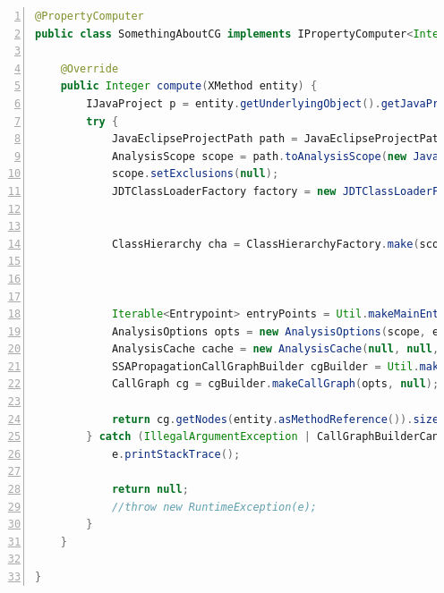 \small
\begin{lstlisting}[language=Java,numbers=left]
@PropertyComputer
public class SomethingAboutCG implements IPropertyComputer<Integer, XMethod> {

	@Override
	public Integer compute(XMethod entity) {
		IJavaProject p = entity.getUnderlyingObject().getJavaProject();
		try {
			JavaEclipseProjectPath path = JavaEclipseProjectPath.make(p, AnalysisScopeType.SOURCE_FOR_PROJ_AND_LINKED_PROJS);
			AnalysisScope scope = path.toAnalysisScope(new JavaSourceAnalysisScope());
			scope.setExclusions(null);
			JDTClassLoaderFactory factory = new JDTClassLoaderFactory(scope.getExclusions());
		
		
			ClassHierarchy cha = ClassHierarchyFactory.make(scope,factory);
			
		
			
			Iterable<Entrypoint> entryPoints = Util.makeMainEntrypoints(scope, cha);
			AnalysisOptions opts = new AnalysisOptions(scope, entryPoints);
			AnalysisCache cache = new AnalysisCache(null, null, null);
			SSAPropagationCallGraphBuilder cgBuilder = Util.makeZeroCFABuilder(opts, cache, cha, scope);
			CallGraph cg = cgBuilder.makeCallGraph(opts, null);
			
			return cg.getNodes(entity.asMethodReference()).size();
		} catch (IllegalArgumentException | CallGraphBuilderCancelException | IOException | CoreException | ClassHierarchyException e) {
			e.printStackTrace();
			
			return null;
			//throw new RuntimeException(e);
		} 
	}

}
\end{lstlisting}
\normalsize{}\label{codeSelection:cfgFinal}
